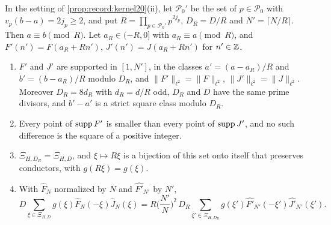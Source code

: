 \begin{lemma}
\label{lem:record:nonunit-rescale}
In the setting of \cref{prop:record:kernel20}(ii), let $\mathcal P_0'$ be the
set of $p\in\mathcal P_0$ with $v_p(b-a)=2j_p\ge2$, and put
$R=\prod_{p\in\mathcal P_0'}p^{2j_p}$, $D_R=D/R$ and $N'=\lceil N/R\rceil$.
Then $a\equiv b\pmod R$. Let $a_R\in(-R,0]$ with $a_R\equiv a\pmod R$, and
$F'(n')=F(a_R+Rn')$, $J'(n')=J(a_R+Rn')$ for $n'\in\mathbb Z$.
\begin{enumerate}[label=(\alph*)]
\item $F'$ and $J'$ are supported in $[1,N']$, in the classes
 $a'=(a-a_R)/R$ and $b'=(b-a_R)/R$ modulo $D_R$, and
 $\|F'\|_{\ell^2}=\|F\|_{\ell^2}$, $\|J'\|_{\ell^2}=\|J\|_{\ell^2}$. Moreover
 $D_R=8d_R$ with $d_R=d/R$ odd, $D_R$ and $D$ have the same prime divisors,
 and $b'-a'$ is a strict square class modulo $D_R$.
\item Every point of $\operatorname{supp} F'$ is smaller than every point of $\operatorname{supp} J'$, and
 no such difference is the square of a positive integer.
\item $\Xi_{H,D_R}=\Xi_{H,D}$, and $\xi\mapsto R\xi$ is a bijection of this set
 onto itself that preserves conductors, with $g(R\xi)=g(\xi)$.
\item With $\widehat F_N$ normalized by $N$ and $\widehat{F'}_{N'}$ by $N'$,
 \[
  D\sum_{\xi\in\Xi_{H,D}}g(\xi)\widehat F_N(-\xi)\widehat J_N(\xi)
  =R\Big(\frac{N'}N\Big)^2\,D_R\sum_{\xi'\in\Xi_{H,D_R}}g(\xi')
  \widehat{F'}_{N'}(-\xi')\widehat{J'}_{N'}(\xi').
 \]
\end{enumerate}
\end{lemma}


